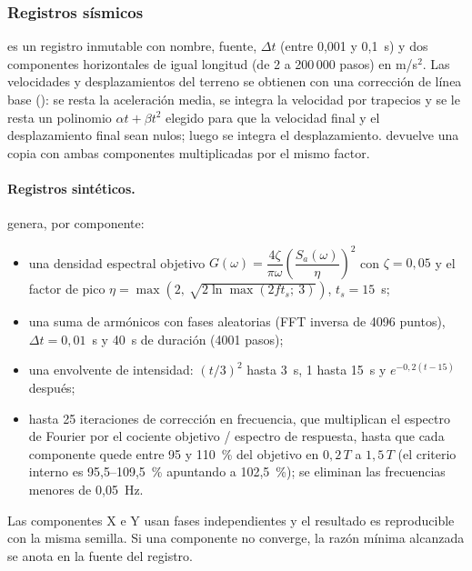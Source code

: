 \subsubsection{Registros sísmicos}

 es un registro inmutable con nombre, fuente, $\Delta t$ (entre 0,001 y 0,1~s) y dos componentes
horizontales de igual longitud (de 2 a 200\,000 pasos) en m/s$^2$. Las velocidades y desplazamientos del terreno se
obtienen con una corrección de línea base (): se resta la aceleración media, se integra la velocidad por
trapecios y se le resta un polinomio $\alpha t + \beta t^2$ elegido para que la velocidad final y el desplazamiento final
sean nulos; luego se integra el desplazamiento.  devuelve una copia con ambas componentes
multiplicadas por el mismo factor.

\paragraph{Registros sintéticos.}  genera, por componente:

\begin{itemize}
	\item una densidad espectral objetivo
	      $G(\omega) = \dfrac{4\zeta}{\pi\omega}\left(\dfrac{S_a(\omega)}{\eta}\right)^2$ con $\zeta = 0{,}05$ y el factor
	      de pico $\eta = \max\!\left(2,\ \sqrt{2 \ln \max(2 f t_s;\ 3)}\right)$, $t_s = 15$~s;
	\item una suma de armónicos con fases aleatorias (FFT inversa de 4096 puntos), $\Delta t = 0{,}01$~s y 40~s de
	      duración (4001 pasos);
	\item una envolvente de intensidad: $(t/3)^2$ hasta 3~s, 1 hasta 15~s y $e^{-0{,}2(t - 15)}$ después;
	\item hasta 25 iteraciones de corrección en frecuencia, que multiplican el espectro de Fourier por el cociente objetivo /
	      espectro de respuesta, hasta que cada componente quede entre 95 y 110~\% del objetivo en $0{,}2\,T$ a $1{,}5\,T$
	      (el criterio interno es 95,5--109,5~\% apuntando a 102,5~\%); se eliminan las frecuencias menores de 0,05~Hz.
\end{itemize}

Las componentes X e Y usan fases independientes y el resultado es reproducible con la misma semilla. Si una componente no
converge, la razón mínima alcanzada se anota en la fuente del registro.

